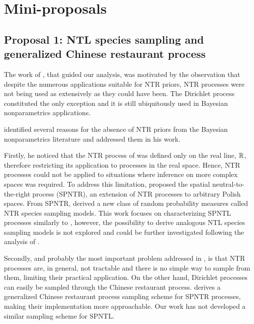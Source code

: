 

\section{Mini-proposals}  \label{proposals}

\subsection{Proposal 1: NTL species sampling and generalized Chinese restaurant process} %

The work of \cite{james2006poisson}, that guided our analysis, was motivated by the observation that despite the numerous applications suitable for NTR priors, NTR processes were not being used as extensively as they could have been. The Dirichlet process constituted the only exception and it is still ubiquitously used in Bayesian nonparametrics applications. 

\cite{james2006poisson} identified several reasons for the absence of NTR priors from the Bayesian nonparametrics literature and addressed them in his work.

Firstly, he noticed that the NTR process of \cite{doksum1974tailfree} was defined only on the real line, $\mathbb{R}$, therefore restricting its application to processes in the real space. Hence, NTR processes could not be applied to situations where inference on more complex spaces was required. To address this limitation, \cite{james2006poisson} proposed the spatial neutral-to-the-right process (SPNTR), an extension of NTR processes to arbitrary Polish spaces. From SPNTR, \cite{james2006poisson} derived a new class of random probability measures called NTR species sampling models. This work focuses on characterizing SPNTL processes similarly to \cite{james2006poisson}, however, the possibility to derive analogous NTL species sampling models is not explored and could be further investigated following the analysis of \cite{james2006poisson}.

Secondly, and probably the most important problem addressed in \cite{james2006poisson}, is that NTR processes are, in general, not tractable and there is no simple way to sample from them, limiting their practical application. On the other hand, Dirichlet processes can easily be sampled through the Chinese restaurant process. \cite{james2006poisson} derives a generalized Chinese restaurant process sampling scheme for SPNTR processes, making their implementation more approachable. Our work has not developed a similar sampling scheme for SPNTL.

